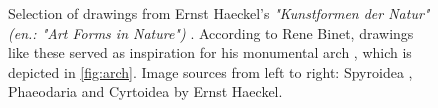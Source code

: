 \documentclass{article}
\begin{document}
\newpage

\begin{figure}
    \centering
    \caption{Selection of drawings from Ernst Haeckel's \textit{"Kunstformen der Natur" (en.: "Art Forms in Nature")} \cite{haeckel_kunstformen_2012}. According to Rene Binet, drawings like these served as inspiration for his monumental arch \cite[Sec. "Haeckel und der Jugendstil"]{willmann_haeckel_2019}, which is depicted in \cref{fig:arch}. Image sources from left to right: Spyroidea \cite{haeckel_kunstformen_1904}, Phaeodaria \cite{haeckel_kunstformen_1904} and Cyrtoidea \cite{haeckel_kunstformen_1904-2} by Ernst Haeckel.}
    \label{fig:kunstformen}
\end{figure}
\end{document}
